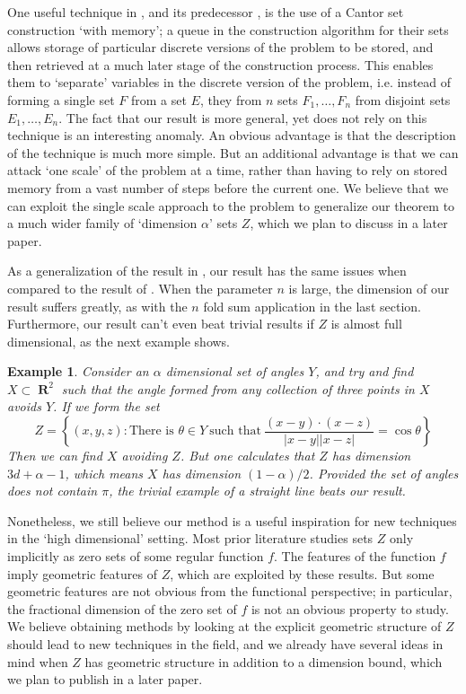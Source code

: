 \documentclass[dvipsnames,letterpaper,12pt]{article}
\numberwithin{equation}{section}
\theoremstyle{plain}
\newtheorem*{example}{Example}
\theoremstyle{remark}
\DeclareMathOperator{\RR}{\mathbf{R}}
\begin{document}
One useful technique in \cite{MalabikaRob}, and its predecessor \cite{KeletiDimOneSet}, is the use of a Cantor set construction `with memory'; a queue in the construction algorithm for their sets allows storage of particular discrete versions of the problem to be stored, and then retrieved at a much later stage of the construction process. This enables them to `separate' variables in the discrete version of the problem, i.e. instead of forming a single set $F$ from a set $E$, they from $n$ sets $F_1, \dots, F_n$ from disjoint sets $E_1, \dots, E_n$. The fact that our result is more general, yet does not rely on this technique is an interesting anomaly. An obvious advantage is that the description of the technique is much more simple. But an additional advantage is that we can attack `one scale' of the problem at a time, rather than having to rely on stored memory from a vast number of steps before the current one. We believe that we can exploit the single scale approach to the problem to generalize our theorem to a much wider family of `dimension $\alpha$' sets $Z$, which we plan to discuss in a later paper.

As a generalization of the result in \cite{MalabikaRob}, our result has the same issues when compared to the result of \cite{Mathe}. When the parameter $n$ is large, the dimension of our result suffers greatly, as with the $n$ fold sum application in the last section. Furthermore, our result can't even beat trivial results if $Z$ is almost full dimensional, as the next example shows.

\begin{example}
	Consider an $\alpha$ dimensional set of angles $Y$, and try and find $X \subset \RR^2$ such that the angle formed from any collection of three points in $X$ avoids $Y$. If we form the set
	\[ Z = \left\{ (x,y,z): \text{There is $\theta \in Y$}\ \text{such that}\ \frac{(x - y) \cdot (x - z)}{|x - y||x - z|} = \cos \theta \right\} \]
	Then we can find $X$ avoiding $Z$. But one calculates that $Z$ has dimension $3d + \alpha - 1$, which means $X$ has dimension $(1 - \alpha) / 2$. Provided the set of angles does not contain $\pi$, the trivial example of a straight line beats our result.
\end{example}

Nonetheless, we still believe our method is a useful inspiration for new techniques in the `high dimensional' setting. Most prior literature studies sets $Z$ only implicitly as zero sets of some regular function $f$. The features of the function $f$ imply geometric features of $Z$, which are exploited by these results. But some geometric features are not obvious from the functional perspective; in particular, the fractional dimension of the zero set of $f$ is not an obvious property to study. We believe obtaining methods by looking at the explicit geometric structure of $Z$ should lead to new techniques in the field, and we already have several ideas in mind when $Z$ has geometric structure in addition to a dimension bound, which we plan to publish in a later paper.
\end{document}
